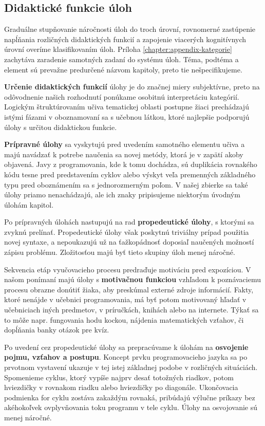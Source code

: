 \subsection{Didaktické funkcie úloh}
Graduálne stupňovanie náročnosti úloh do troch úrovní, rovnomerné zastúpenie napĺňania rozličných didaktických funkcií a zapojenie viacerých kognitívnych úrovní overíme klasifikovaním úloh. Príloha \ref{chapter:appendix-kategorie} zachytáva zaradenie samotných zadaní do systému úloh. Téma, podtéma a element sú prevažne predurčené názvom kapitoly, preto tie nešpecifikujeme.

\textbf{Určenie didaktických funkcií} úlohy je do značnej miery subjektívne, preto na odôvodnenie našich rozhodnutí ponúkame osobitnú interpretáciu kategórií. Logickým štruktúrovaním učiva tematickej oblasti postupne žiaci prechádzajú istými fázami v oboznamovaní sa s učebnou látkou, ktoré najlepšie podporujú úlohy s určitou didaktickou funkcie.

\textbf{Prípravné úlohy} sa vyskytujú pred uvedením samotného elementu učiva a majú navádzať k potrebe naučenia sa novej metódy, ktorá je v zapätí akoby objavená. Javy z programovania, kde k tomu dochádza, sú duplikácia rovnakého kódu tesne pred predstavením cyklov alebo výskyt veľa premenných základného typu pred oboznámením sa s jednorozmerným poľom. V našej zbierke sa také úlohy priamo nenachádzajú, ale ich znaky pripisujeme niektorým úvodným úlohám kapitol.

Po prípravných úlohách nastupujú na rad \textbf{propedeutické úlohy}, s ktorými sa zvyknú prelínať. Propedeutické úlohy však poskytnú triviálny prípad použitia novej syntaxe, a nepoukazujú už na ťažkopádnosť doposiaľ naučených možností zápisu problému. Zložitosťou majú byť tieto skupiny úloh menej náročné.

Sekvencia etáp vyučovacieho procesu predraďuje motiváciu pred expozíciou. V našom ponímaní majú úlohy s \textbf{motivačnou funkciou} vzhľadom k poznávaciemu procesu obrazne donútiť žiaka, aby preskúmal externé zdroje informácií. Fakty, ktoré nenájde v učebnici programovania, má byť potom motivovaný hľadať v učebniciach iných predmetov, v príručkách, knihách alebo na internete. Týkať sa to môže napr. fungovania hodu kockou, nájdenia matematických vzťahov, či dopĺňania banky otázok pre kvíz.

Po uvedení cez propedeutické úlohy sa prepracúvame k úlohám na \textbf{osvojenie pojmu, vzťahov a postupu}. Koncept prvku programovacieho jazyka sa po prvotnom vystavení
ukazuje v tej istej základnej podobe v rozličných situáciách. Spomenieme cyklus, ktorý vypíše najprv desať totožných riadkov, potom hviezdičky v rovnakom riadku alebo hviezdičky po diagonále. Ukončovacia podmienka for cyklu zostáva zakaždým rovnaká, pribúdajú výlučne príkazy bez akéhokoľvek ovplyvňovania toku programu v tele cyklu. Úlohy na osvojovanie sú menej náročné.

